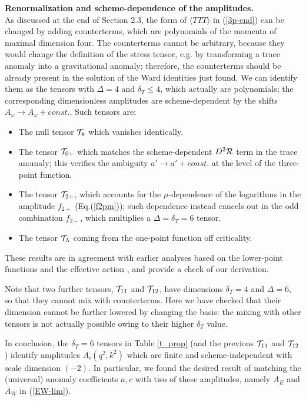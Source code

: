 \documentclass[11pt]{article}
\def\o{\omega}
\def\TTT{\bra TTT\ket}
\def\bra{\langle}
\def\ket{\rangle}
\def\dt{{\delta_T}} %
\begin{document}
\noindent
{\bf Renormalization and scheme-dependence of the amplitudes.}\\
As discussed at the end of Section 2.3, the form of $\TTT$ in 
(\ref{3p-end}) can be changed by adding counterterms, which are
polynomials of the momenta of maximal dimension four.
The counterterms cannot be arbitrary, because they would change the
definition of the stress tensor, e.g. by transforming a trace anomaly into
a gravitational anomaly; therefore, the counterterms should be already present
in the solution of the Ward identities just found.
We can identify them as the tensors with $\Delta=4$ and $\dt \le 4$,
which actually are polynomials; the corresponding
dimensionless amplitudes are scheme-dependent by the shifts
$A_\o \to A_\o + const.$.
Such tensors are:
\begin{itemize}
\item
The null tensor ${\cal T}_8$ which vanishes identically.
\item
The tensor ${\cal T}_{0+}$ which matches the
scheme-dependent $D^2 {\cal R}$ term in the trace anomaly; 
this verifies the ambiguity
$a' \to a' + const.$ at the level of the three-point function.
\item
The tensor ${\cal T}_{2+}$, which accounts
for the $\mu$-dependence of the logarithms in the amplitude
$f_{2+}$ (Eq.(\ref{f2pm})); such dependence instead cancels out in the
odd combination $f_{2-}$, which multiplies a $\Delta=\dt=6$ tensor.
\item
The tensor ${\cal T}_\Lambda$ coming from the one-point function off
criticality.
\end{itemize}
These results are in agreement with earlier analyses based on the
lower-point functions and the effective action \cite{duff}\cite{cfl}
\cite{ds}\cite{os}, and provide a check of our derivation.

Note that two further tensors, ${\cal T}_{11}$ and
${\cal T}_{12}$, have dimensions $\dt =4 $ and $\Delta=6$,
so that they cannot mix with counterterms. 
Here we have checked that their dimension cannot be further lowered by
changing the basis: the mixing with other tensors is not actually 
possible owing to their higher $\dt$ value.

In conclusion, the $\dt=6$ tensors in Table \ref{t_prop} 
(and the previous ${\cal T}_{11}$ and ${\cal T}_{12}$) identify
amplitudes $A_i(q^2, k^2)$ which are finite and scheme-independent 
with scale dimension $(-2)$.
In particular, we found the desired result of 
matching the (universal) anomaly coefficients $a,c$
with two of these amplitudes, namely $A_E$ and $A_W$ in (\ref{EW-lim}).
\end{document}
